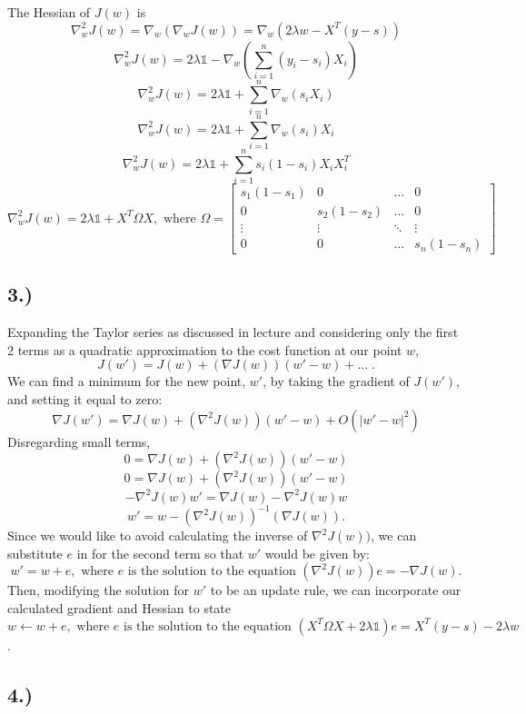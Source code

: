\documentclass{report}
\begin{document}
The Hessian of $J(w)$ is 
$$ \nabla_w^2 J(w) = \nabla_w(\nabla_w J(w)) = \nabla_w ( 2 \lambda w - X^T(y-s) ) $$
$$ \nabla_w^2 J(w) = 2 \lambda\mathbb{1} - \nabla_w \left(\sum_{i=1}^n{\left( y_i - s_i \right)X_i}\right) $$
$$ \nabla_w^2 J(w) = 2 \lambda\mathbb{1} + \sum_{i=1}^n{\nabla_w (s_i X_i)} $$
$$ \nabla_w^2 J(w) = 2 \lambda\mathbb{1} + \sum_{i=1}^n{\nabla_w(s_i)X_i} $$
$$ \nabla_w^2 J(w) = 2 \lambda\mathbb{1} + \sum_{i=1}^n{s_i(1-s_i)X_i X_i^T} $$
$$\boxed{ \nabla_w^2 J(w) = 2 \lambda\mathbb{1} + X^T \Omega X}, \text{ where } 
									\Omega = \begin{bmatrix} s_1(1-s_1) & 0 & \hdots & 0 \\
														0 & s_2(1-s_2) & \hdots & 0 \\
														\vdots & \vdots & \ddots & \vdots \\
														0 & 0 & \hdots & s_n(1-s_n)
											\end{bmatrix} $$
											


\subsection*{3.)}

Expanding the Taylor series as discussed in lecture and considering only the first 2 terms as a quadratic approximation to the cost function at our point $w$, 
$$ J(w') = J(w) + (\nabla J(w))(w'-w) + ... \; .$$
We can find a minimum for the new point, $w'$, by taking the gradient of $J(w')$, and setting it equal to zero:
$$ \nabla J(w') = \nabla J(w) + (\nabla^2 J(w))(w'-w) + O(|w'-w|^2) $$
Disregarding small terms,
$$ 0 = \nabla J(w) + (\nabla^2 J(w))(w'-w) $$
$$ 0 = \nabla J(w) + (\nabla^2 J(w))(w'-w) $$
$$ -\nabla^2 J(w) w' = \nabla J(w)  - \nabla^2 J(w) w $$
$$ w' = w - (\nabla^2 J(w))^{-1}(\nabla J(w)) .$$
Since we would like to avoid calculating the inverse of $\nabla^2 J(w))$, we can substitute $e$ in for the second term so that $w'$ would be given by: 
$$ w' = w + e , \text{ where } e \text{ is the solution to the equation } (\nabla^2 J(w))e = -\nabla J(w) .$$
Then, modifying the solution for $w'$ to be an update rule, we can incorporate our calculated gradient and Hessian to state
$$\boxed{ w \leftarrow w + e , \text{ where } e \text{ is the solution to the equation } ( X^T \Omega X + 2\lambda\mathbb{1} ) e = X^T(y-s) - 2 \lambda w }.$$.


\subsection*{4.)}
\end{document}
